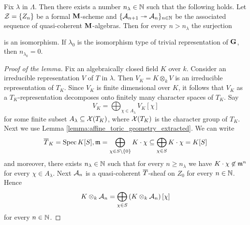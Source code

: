 \begin{lemma}[Stabilization]\label{lemma:stabilization_lemma}
Fix $\lambda$ in $\Lambda$. Then there exists a number $n_{\lambda}\in {\mathbb N}$ such that the following holds. Let ${\mathcal Z}=\{Z_n\}$ be a formal $\mathbf{M}$-scheme and $\{{\mathcal A}_{n+1} \twoheadrightarrow {\mathcal A}_n\}_{n\in {\mathbb N}}$ be the associated sequence of quasi-coherent $\mathbf{M}$-algebras. Then for every $n > n_{\lambda}$ the surjection
\begin{center}
\end{center}
is an isomorphism. If $\lambda_0$ is the isomorphism type of trivial representation of $\mathbf{G}$, then $n_{\lambda_0} = 0$.
\end{lemma}
\begin{proof}[Proof of the lemma]
Fix an algebraically closed field $K$ over $k$. Consider an irreducible representation $V$ of $T$ in $\lambda$. Then $V_K = K\otimes_kV$ is an irreducible representation of $T_K$. Since $V_K$ is finite dimensional over $K$, it follows that $V_K$ as a $T_K$-representation decomposes onto finitely many character spaces of $T_K$. Say
$$V_K = \bigoplus_{\chi \in A_{\lambda}}V_K[\chi]$$
for some finite subset $A_{\lambda}\subseteq {\mathcal X}(T_K)$, where ${\mathcal X}(T_K)$ is the character group of $T_K$. Next we use Lemma \ref{lemma:affine_toric_geometry_extracted}. We can write
$$\overline{T}_K = \mathrm{Spec}\, K[S],\mathfrak{m} = \bigoplus_{\chi \in S\setminus \{0\}}K \cdot \chi\subseteq \bigoplus_{\chi \in S}K \cdot \chi = K[S]$$
and moreover, there exists $n_{\lambda}\in {\mathbb N}$ such that for every $n\geq n_{\lambda}$ we have $K\cdot \chi \not \in \mathfrak{m}^n$ for every $\chi\in A_{\lambda}$. Next ${\mathcal A}_n$ is a quasi-coherent $\overline{T}$-sheaf on $Z_0$ for every $n\in {\mathbb N}$. Hence
$$K\otimes_k{\mathcal A}_n = \bigoplus_{\chi \in S}\left(K\otimes_k{\mathcal A}_n\right)[\chi]$$
for every $n\in {\mathbb N}$.
\end{proof}
















\small




